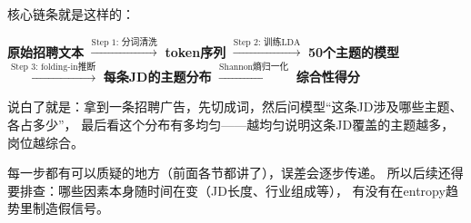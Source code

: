 \documentclass[12pt,a4paper]{ctexart}
\begin{document}
\vspace{0.5em}

核心链条就是这样的：

\begin{center}
\textbf{原始招聘文本} $\xrightarrow{\text{Step 1: 分词清洗}}$
\textbf{token序列} $\xrightarrow{\text{Step 2: 训练LDA}}$
\textbf{50个主题的模型} $\xrightarrow{\text{Step 3: folding-in推断}}$
\textbf{每条JD的主题分布} $\xrightarrow{\text{Shannon熵归一化}}$
\textbf{综合性得分}
\end{center}

说白了就是：拿到一条招聘广告，先切成词，然后问模型``这条JD涉及哪些主题、各占多少''，
最后看这个分布有多均匀——越均匀说明这条JD覆盖的主题越多，岗位越综合。

每一步都有可以质疑的地方（前面各节都讲了），误差会逐步传递。
所以后续还得要排查：哪些因素本身随时间在变（JD长度、行业组成等），
有没有在entropy趋势里制造假信号。
\end{document}

